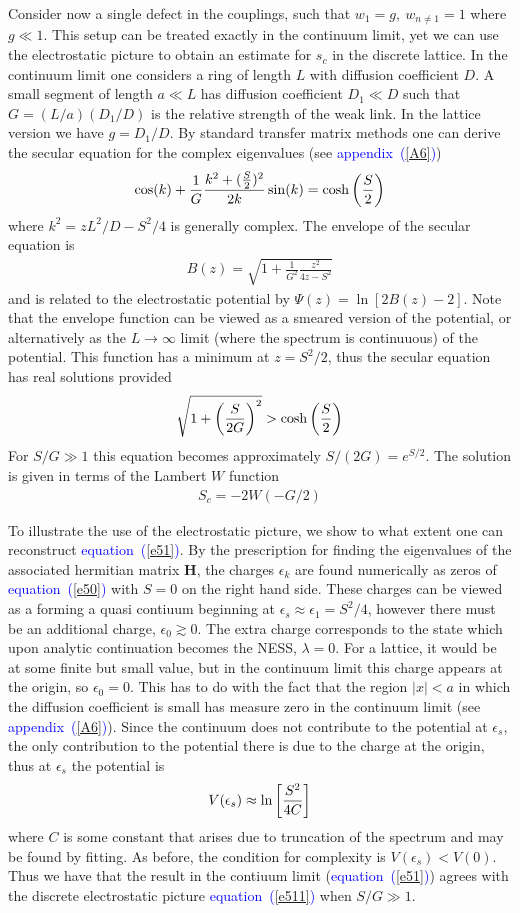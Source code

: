 \documentclass[aps,pre,floats,floatfix,twocolumn]{revtex4}
\newcommand{\be}[1]{\begin{eqnarray}\ifthenelse{#1=-1}{\nonumber}{\ifthenelse{#1=0}{}{\label{e#1}}}}
\newcommand{\beq}{\begin{eqnarray}}
\newcommand{\eeq}{\end{eqnarray}}
\newcommand{\Eq}[1]{\textcolor{blue}{{equation}\!~(\ref{#1})}}
\newcommand{\Ap}[1]{\textcolor{blue}{{appendix}\!~(\ref{#1})}}
\begin{document}
Consider now a single defect in the couplings, such that  $w_1 = g, \ w_{n\neq1}=1$ where $g\ll1$.
This setup can be treated exactly in the continuum limit, 
yet we can use the electrostatic picture to obtain an estimate for $s_c$ in the discrete lattice. 
In the continuum limit one considers a ring of length $L$ with diffusion coefficient $D$. 
A small segment of length $a\ll L$ has 
diffusion coefficient $D_1 \ll D$ such that $G=(L/a)(D_1/D) $  is the relative strength of the weak link. 
In the lattice version we have $g=D_1/D$.
By standard transfer matrix methods one  can derive the secular equation for the complex eigenvalues (see \Ap{A6})
%
\be{50}
 \cos(k) + \frac{1}{G} \frac{k^2+(\frac{S}{2})^2}{2k}\sin(k)= \cosh \left(\frac{S}{2} \right)
\eeq
%
where $k^2= {z L^2/D - S^2/4}$ is generally complex.
The envelope of the secular equation is
%
\beq
B(z) = \sqrt{1+\frac{1}{G^2} \frac{z^2}{4z - S^2}}
\eeq
%
and is related to the electrostatic potential by ${\Psi(z) = \ln\left[2B(z)-2\right]}$.
Note that the envelope function can be viewed as a smeared version of the potential, or alternatively 
as the $L\to \infty$ limit (where the spectrum is continuuous) of the potential.
This function has a minimum at $z = S^2/2$, thus the secular equation has real solutions provided 
%
\be{51}
\sqrt{1+\left(\frac{S}{2G}\right)^2} > \cosh \left(\frac{S}{2}\right)
\eeq
%
For $S/G \gg 1$ this equation becomes approximately ${S/(2G) = e^{S/2}}$. The solution is given in terms of the Lambert $W$ function
%
\beq
S_c = -2 W(-G/2)
\eeq


To illustrate the use of the electrostatic picture, we show to what extent one can reconstruct \Eq{e51}. 
By the prescription for finding the eigenvalues of the associated hermitian matrix $\bm{H}$, 
the charges $\epsilon_k$ are found numerically as zeros of \Eq{e50} with $S=0$ on the right hand side. 
These charges can be viewed as a forming a quasi contiuum beginning at $\epsilon_s \approx \epsilon_1= S^2/4$, 
however there must be an additional charge, $\epsilon_0 \gtrsim 0$. 
The extra charge corresponds to the state which upon analytic continuation becomes the NESS, $\lambda = 0$.
For a lattice, it would be at some finite but small value, but in the continuum limit this charge appears at the origin, so $\epsilon_0=0$.
This has to do with the fact that the region $|x|<a$ in which the diffusion coefficient is small has measure zero in the continuum limit (see \Ap{A6}).
Since the continuum does not contribute to the potential at $\epsilon_s$, 
the only contribution to the potential there is due to the charge at the origin, 
thus at $\epsilon_s$ the potential is
%
\be{511}
V(\epsilon_s) \approx \ln \left[\frac{S^2}{4C}\right]
\eeq
%
where $C$ is some constant that arises due to truncation of the spectrum and may be found by fitting.
As before, the condition for complexity is 
$V(\epsilon_s) < V(0)$.
%
Thus we have that the result in the contiuum limit (\Eq{e51}) agrees with the discrete electrostatic picture \Eq{e511} when $S/G \gg 1$.
\end{document}
